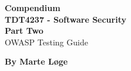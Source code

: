 \begin{titlepage}
\begin{center}

{\Huge \bf Compendium} \\[1.0cm]
{\Huge \bf TDT4237 - Software Security}\\[1.0cm]
{\Large \bf Part Two} \\

{\Large OWASP Testing Guide}

\vspace{14cm}

\centering
{\Large \bf By Marte Løge}



\end{center}
\end{titlepage}